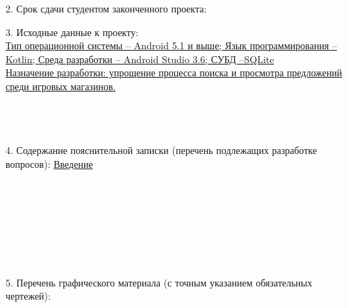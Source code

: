 {  \vspace{1em}

  2. Срок сдачи студентом законченного проекта: \underline{\hspace*{5em}}

  \vspace{1em}

  3. Исходные данные к проекту:\\
\uline{Тип операционной системы – Android 5.1 и выше; Язык программирования – Kotlin; Среда разработки – Android Studio 3.6; СУБД –SQLite\hfill}\\
\uline{Назначение разработки: упрощение процесса поиска и просмотра предложений среди игровых магазинов.\hfill}\\
\uline{\hfill}\\
\uline{\hfill}\\
\uline{\hfill}\\

  \vspace{1em}

  4. Содержание пояснительной записки (перечень подлежащих разработке вопросов):
\uline{Введение\hfill}\\
\uline{\hfill}\\
\uline{\hfill}\\
\uline{\hfill}\\
\uline{\hfill}\\
\uline{\hfill}\\
\uline{\hfill}\\
\uline{\hfill}\\


  \clearpage
  \thispagestyle{empty}

  5. Перечень графического материала (с точным указанием обязательных чертежей):
  \uline{\hfill}\\
  \uline{\hfill}\\
  \uline{\hfill}\\
  \uline{\hfill}\\
  \uline{\hfill}\\
  \uline{\hfill}\\


}
